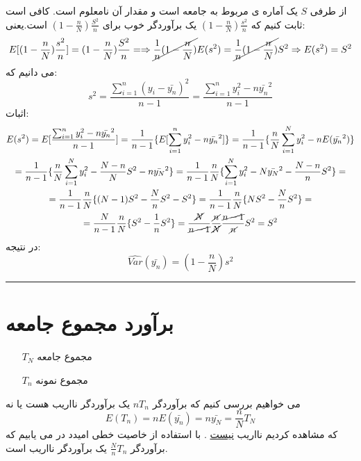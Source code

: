 از طرفی 
$S$
یک آماره ی مربوط به جامعه است و مقدار آن نامعلوم است.
کافی است ثابت کنیم که 
$(1-\frac{n}{N})\frac{s^2}{n}$ 
یک برآوردگر خوب برای 
$(1-\frac{n}{N})\frac{S^2}{n}$
است.یعنی:
\begin{equation*}
	E[(1-\frac{n}{N})\frac{s^2}{n}]=(1-\frac{n}{N})\frac{S^2}{n}
	=\Rightarrow \cancel{\frac{1}{n}(1-\frac{n}{N})}E(s^2)=\cancel{\frac{1}{n}(1-\frac{n}{N})}S^2
	\Rightarrow E(s^2)=S^2
\end{equation*}
می دانیم که:
\begin{equation*}
	s^2=\frac{\sum_{i=1}^{n}(y_i-\bar{y_n})^2}{n-1}
	=\frac{\sum_{i=1}^{n}y_i^2-n\bar{y_n}^2}{n-1}
\end{equation*}
اثبات:
\begin{multline*}
	E(s^2)=E[\frac{\sum_{i=1}^{n}y_i^2-n\bar{y_n}^2}{n-1}]
	=\frac{1}{n-1}\{E[\sum_{i=1}^{n}y_i^2-n\bar{y_n}^2]\}
	=\frac{1}{n-1}\{\frac{n}{N}\sum_{i=1}^{N}y_i^2 -nE(\bar{y_n}^2)\}
	\\=
	\frac{1}{n-1}\{\frac{n}{N}\sum_{i=1}^{N}y_i^2 - \frac{N-n}{N}S^2-n\bar{y_N}^2\}
	=\frac{1}{n-1} \frac{n}{N}\{\sum_{i=1}^{N}y_i^2-N\bar{y_N}^2 - \frac{N-n}{n}S^2\}
	=\\=
	\frac{1}{n-1} \frac{n}{N}\{(N-1)S^2 - \frac{N}{n}S^2-S^2 \}
	=\frac{1}{n-1} \frac{n}{N}\{NS^2 - \frac{N}{n}S^2 \}
	= \\ =
	\frac{N}{n-1} \frac{n}{N}\{S^2 - \frac{1}{n}S^2 \}
	=\frac{\cancel{N}}{\cancel{n-1}} \frac{\cancel{n}}{\cancel{N}}\frac{\cancel{n-1}}{\cancel{n}}S^2
	=S^2
\end{multline*}
در نتیجه:
\begin{equation*}
	\hat{Var}(\bar{y_n})=(1-\frac{n}{N})s^2
\end{equation*}
\rule{\textwidth}{0.4pt}
\section*{برآورد مجموع جامعه}
\begin{itemize}
	\item[$T_N$] مجموع جامعه
	\item[$T_n$] مجموع نمونه
\end{itemize} 
می خواهیم بررسی کنیم که برآوردگر 
$nT_n$
یک برآوردگر نااریب هست یا نه
\begin{equation*}
	E(T_n)=nE(\bar{y_n})=n\bar{y_N}=\frac{n}{N}T_N
\end{equation*}
که مشاهده کردیم نااریب
\underline{نیست}
.
با استفاده از خاصیت خطی امیدد در می یابیم که برآوردگر
$\frac{N}{n}T_n$
یک برآوردگر نااریب است.

